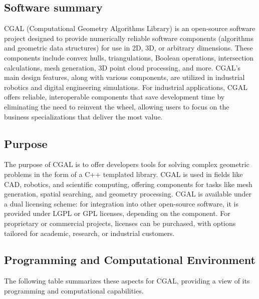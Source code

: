 \subsection{Software summary}
\label{sec:CGAL:summary}

CGAL (Computational Geometry Algorithms Library) is an open-source software project designed to provide 
numerically reliable software components (algorithms and geometric data structures) for use in 2D, 3D, or arbitrary dimensions.
These components include convex hulls, triangulations, Boolean operations, intersection calculations, mesh generation, 
3D point cloud processing, and more. CGAL’s main design features, along with various components, are utilized in industrial 
robotics and digital engineering simulations. For industrial applications, CGAL offers reliable, interoperable components 
that save development time by eliminating the need to reinvent the wheel, allowing users to focus on the business specializations 
that deliver the most value.




\subsection{Purpose}
\label{sec:CGAL:purpose}

The purpose of CGAL is to offer developers tools for solving complex geometric problems in the form of a C++ templated library. 
CGAL is used in fields like CAD, robotics, and scientific computing, offering components for tasks like mesh generation, 
spatial searching, and geometry processing. CGAL is available under a dual licensing scheme: for integration into other open-source software, 
it is provided under LGPL or GPL licenses, depending on the component. For proprietary or commercial projects, 
licenses can be purchased, with options tailored for academic, research, or industrial customers.

\subsection{Programming and Computational Environment}
\label{sec::CGAL:environment_capabilities}



The following table summarizes these aspects for CGAL, providing a  view of its programming and computational capabilities.

